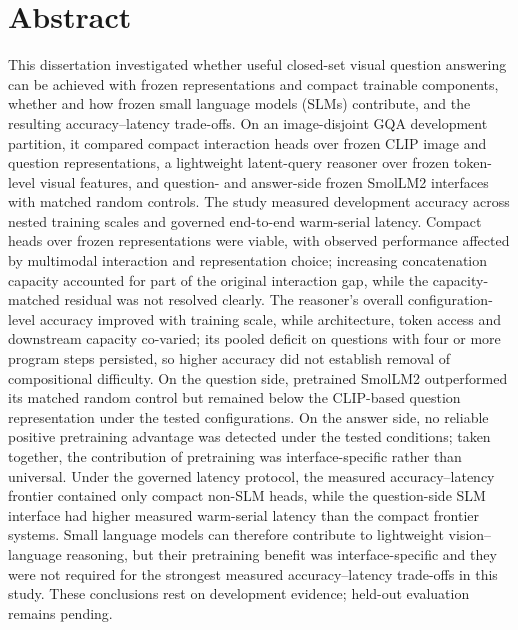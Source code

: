 \chapter*{Abstract}
This dissertation investigated whether useful closed-set visual question answering can be achieved with frozen representations and compact trainable components, whether and how frozen small language models (SLMs) contribute, and the resulting accuracy--latency trade-offs. On an image-disjoint GQA development partition, it compared compact interaction heads over frozen CLIP image and question representations, a lightweight latent-query reasoner over frozen token-level visual features, and question- and answer-side frozen SmolLM2 interfaces with matched random controls. The study measured development accuracy across nested training scales and governed end-to-end warm-serial latency. Compact heads over frozen representations were viable, with observed performance affected by multimodal interaction and representation choice; increasing concatenation capacity accounted for part of the original interaction gap, while the capacity-matched residual was not resolved clearly. The reasoner's overall configuration-level accuracy improved with training scale, while architecture, token access and downstream capacity co-varied; its pooled deficit on questions with four or more program steps persisted, so higher accuracy did not establish removal of compositional difficulty. On the question side, pretrained SmolLM2 outperformed its matched random control but remained below the CLIP-based question representation under the tested configurations. On the answer side, no reliable positive pretraining advantage was detected under the tested conditions; taken together, the contribution of pretraining was interface-specific rather than universal. Under the governed latency protocol, the measured accuracy--latency frontier contained only compact non-SLM heads, while the question-side SLM interface had higher measured warm-serial latency than the compact frontier systems. Small language models can therefore contribute to lightweight vision--language reasoning, but their pretraining benefit was interface-specific and they were not required for the strongest measured accuracy--latency trade-offs in this study. These conclusions rest on development evidence; held-out evaluation remains pending.
